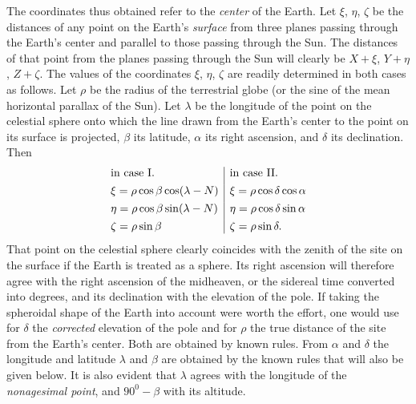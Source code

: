 The coordinates thus obtained refer to the \textit{center} of the Earth. Let $\xi$, $\eta$, $\zeta$ be the distances of any point on the Earth's \textit{surface} from three planes passing through the Earth's center and parallel to those passing through the Sun. The distances of that point from the planes passing through the Sun will clearly be $X+\xi$, $Y+\eta$, $Z+\zeta$. The values of the coordinates $\xi$, $\eta$, $\zeta$ are readily determined in both cases as follows. Let $\rho$ be the radius of the terrestrial globe (or the sine of the mean horizontal parallax of the Sun). Let $\lambda$ be the longitude of the point on the celestial sphere onto which the line drawn from the Earth's center to the point on its surface is projected, $\beta$ its latitude, $\alpha$ its right ascension, and $\delta$ its declination. Then
\[
\begin{array}{@{}l|l@{}}
\text{in case I.}&\text{in case II.}\\[.4em]
\xi=\rho\cos\beta\cos(\lambda-N)&\xi=\rho\cos\delta\cos\alpha\\[.4em]
\eta=\rho\cos\beta\sin(\lambda-N)&\eta=\rho\cos\delta\sin\alpha\\[.4em]
\zeta=\rho\sin\beta&\zeta=\rho\sin\delta.
\end{array}
\]
That point on the celestial sphere clearly coincides with the zenith of the site on the surface if the Earth is treated as a sphere. Its right ascension will therefore agree with the right ascension of the midheaven, or the sidereal time converted into degrees, and its declination with the elevation of the pole. If taking the spheroidal shape of the Earth into account were worth the effort, one would use for $\delta$ the \textit{corrected} elevation of the pole and for $\rho$ the true distance of the site from the Earth's center. Both are obtained by known rules. From $\alpha$ and $\delta$ the longitude and latitude $\lambda$ and $\beta$ are obtained by the known rules that will also be given below. It is also evident that $\lambda$ agrees with the longitude of the \textit{nonagesimal point}, and $90^0-\beta$ with its altitude.

